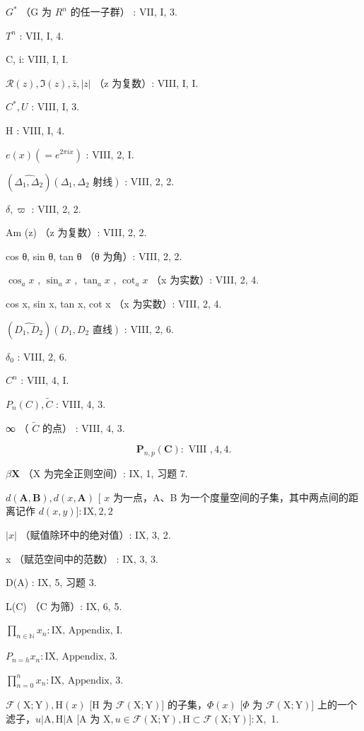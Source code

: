 \(G^{*}\) （G 为 \(R^{n}\) 的任一子群） : VII, I, 3.

\(T^{n}\) : VII, I, 4.

C, i: VIII, I, I.

\(\mathcal{R}(z), \Im(z), \bar{z}, |z|\) （z 为复数）: VIII, I, I.

\(C^{*}, U\) : VIII, I, 3.

H : VIII, I, 4.

\(e(x) (= e^{2\pi ix})\) : VIII, 2, I.

\((\widehat{\Delta_{1}, \Delta_{2}})(\Delta_{1}, \Delta_{2}\text{ 射线})\) : VIII, 2, 2.

\(\delta, \varpi\) : VIII, 2, 2.

Am (z) （z 为复数）: VIII, 2, 2.

cos θ, sin θ, tan θ （θ 为角）: VIII, 2, 2.

\(\cos_{a}x\) , \(\sin_{a}x\) , \(\tan_{a}x\) , \(\cot_{a}x\) （x 为实数）: VIII, 2, 4.

cos x, sin x, tan x, cot x （x 为实数）: VIII, 2, 4.

\((\widehat{D_{1}, D_{2}})(D_{1}, D_{2}\text{ 直线})\) : VIII, 2, 6.

\(\delta_{0}\) : VIII, 2, 6.

\(C^{n}\) : VIII, 4, I.

\(P_{n}(C), \tilde{C}\) : VIII, 4, 3.

∞ （ \(\tilde{C}\) 的点） : VIII, 4, 3.

\[
\mathbf {P} _ {n, p} (\mathbf {C}): \text { VIII }, 4, 4.
\]

\(\beta \mathbf{X}\) （X 为完全正则空间）: IX, 1, 习题 7.

\(d(\mathbf{A}, \mathbf{B}), d(x, \mathbf{A})\) {[} \(x\) 为一点，A、B 为一个度量空间的子集，其中两点间的距离记作 \(d(x, y)] : \mathrm{IX}, 2, 2\)

\(|x|\) （赋值除环中的绝对值）: IX, 3, 2.

\textbar\textbar x\textbar\textbar{} （赋范空间中的范数） : IX, 3, 3.

D(A) : IX, 5, 习题 3.

L(C) （C 为筛）: IX, 6, 5.

\(\prod_{n \in \mathbb{N}} x_n : \text{IX, Appendix, I.}\)

\(P_{n=h} x_n : \text{IX, Appendix, 3.}\)

\(\prod_{n=0}^{n} x_n: \text{IX, Appendix, 3.}\)

\(\mathcal{F}(\mathrm{X};\mathrm{Y}),\mathrm{H}(x)\) {[}H 为 \(\mathcal{F}(\mathrm{X};\mathrm{Y})]\) 的子集，\(\Phi (x)\) {[}\(\Phi\) 为 \(\mathcal{F}(\mathrm{X};\mathrm{Y})]\) 上的一个滤子，\(u|\mathrm{A},\mathrm{H}|\mathrm{A}\) {[}A 为 \(\mathrm{X},u\in \mathcal{F}(\mathrm{X};\mathrm{Y}),\mathrm{H}\subset \mathcal{F}(\mathrm{X};\mathrm{Y})]:\mathrm{X},\) 1.

